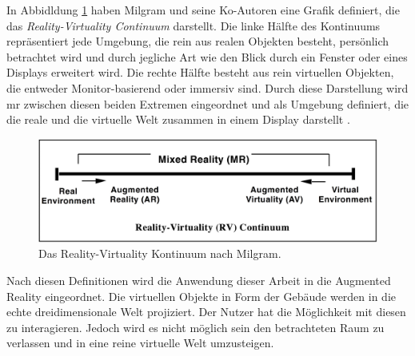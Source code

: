 In Abbidldung \ref*{fig: RV_Kontinuum} haben Milgram und seine Ko-Autoren eine Grafik definiert, die das \textit{Reality-Virtuality Continuum} darstellt. Die linke Hälfte des Kontinuums repräsentiert jede Umgebung, die rein aus realen Objekten besteht, persönlich betrachtet wird und durch jegliche Art wie den Blick durch ein Fenster oder eines Displays erweitert wird. Die rechte Hälfte besteht aus rein virtuellen Objekten, die entweder Monitor-basierend oder immersiv sind. Durch diese Darstellung wird \acrshort{mr} zwischen diesen beiden Extremen eingeordnet und als Umgebung definiert, die die reale und die virtuelle Welt zusammen in einem Display darstellt \cite{Milgram1995}.

\begin{figure}[H]
    \centering
    \includegraphics[width=\textwidth]{img/einordnung_vr_ar_mr/vr_ar_mr_kontinuum.jpg}
    \caption{Das Reality-Virtuality Kontinuum nach Milgram\cite{Milgram1995}.}
    \label{fig: RV_Kontinuum}
\end{figure}

Nach diesen Definitionen wird die Anwendung dieser Arbeit in die Augmented Reality eingeordnet. Die virtuellen Objekte in Form der Gebäude werden in die echte dreidimensionale Welt projiziert. Der Nutzer hat die Möglichkeit mit diesen zu interagieren. Jedoch wird es nicht möglich sein den betrachteten Raum zu verlassen und in eine reine virtuelle Welt umzusteigen. 
